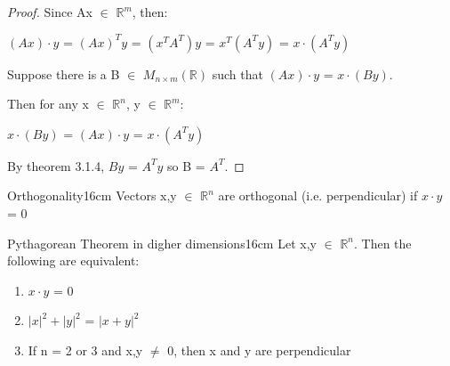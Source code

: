     \begin{proof}
        Since Ax $\in$ $\mathbb{R}^m$, then:

        \hspace{0.5cm}
        $(Ax) \cdot y$
        = $(Ax)^Ty$
        = $(x^T A^T) y$
        = $x^T (A^T y)$
        = $x \cdot (A^T y)$

        Suppose there is a B $\in$ $M_{n \times m}(\mathbb{R})$
        such that $(Ax) \cdot y$ = $x \cdot (By)$.
        
        Then for any x $\in$ $\mathbb{R}^n$,
        y $\in$ $\mathbb{R}^m$:

        \hspace{0.5cm}
        $x \cdot (By)$
        = $(Ax) \cdot y$
        = $x \cdot (A^T y)$

        By {\color{red} theorem 3.1.4},
        $B y$ = $A^T y$ so B = $A^T$.
    \end{proof}

    \vspace{0.5cm}



    \begin{definition}{Orthogonality}{16cm}
        Vectors x,y $\in$ $\mathbb{R}^n$
        are {\color{lblue} orthogonal} (i.e. perpendicular)
        if $x \cdot y$ = 0
    \end{definition}

    \newpage



    \begin{wtheorem}{Pythagorean Theorem in digher dimensions}{16cm}
        Let x,y $\in$ $\mathbb{R}^n$. Then the following are equivalent:

        \begin{enumerate}[label=(\alph*), leftmargin=1cm, itemsep=0.1cm]
            \item $x \cdot y$ = 0
            
            \item $|x|^2 + |y|^2$ = $|x+y|^2$
            
            \item If n = 2 or 3 and x,y $\not =$ 0, then x and y
                are perpendicular
        \end{enumerate}
    \end{wtheorem}

